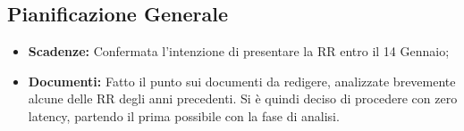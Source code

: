\documentclass[a4paper, oneside, openany, dvipsnames, table]{article}
\begin{document}
\subsection{Pianificazione Generale}
\begin{itemize}
\item \textbf{Scadenze:} Confermata l’intenzione di presentare la RR entro il 14 Gennaio;
\item \textbf{Documenti:} Fatto il punto sui documenti da redigere, analizzate brevemente alcune delle RR degli anni precedenti. Si è quindi deciso di procedere con zero latency, partendo il prima possibile con la fase di analisi.
\end{itemize}


\newpage
\end{document}
